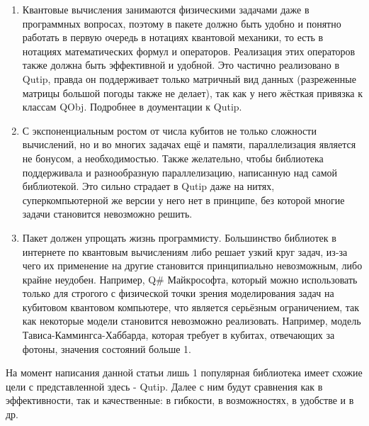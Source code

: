 \documentclass[aps,twocolumn,pra,showpacs,amsmath,amssymb,showkeys,10pt]{revtex4-2}
\begin{document}
          \begin{enumerate}
            \item Квантовые вычисления занимаются физическими задачами даже в программных вопросах, поэтому в пакете должно быть удобно и понятно работать в первую очередь в нотациях квантовой механики, 
            то есть в нотациях математических формул и операторов. Реализация этих операторов также должна быть эффективной и удобной. Это частично реализовано в Qutip, правда он поддерживает 
            только матричный вид данных (разреженные матрицы большой погоды также не делает), так как у него жёсткая привязка к классам QObj. Подробнее в доументации к Qutip.

            \item С экспоненциальным ростом от числа кубитов не только сложности вычислений, но и во многих задачах ещё и памяти, параллелизация является не бонусом, а необходимостью. Также желательно, 
            чтобы библиотека поддерживала и разнообразную параллелизацию, написанную над самой библиотекой.
            Это сильно страдает в Qutip даже на нитях, суперкомпьютерной же версии у него нет в принципе, без которой многие задачи становится невозможно решить.
            
            \item Пакет должен упрощать жизнь программисту. Большинство библиотек в интернете по квантовым вычислениям либо решает узкий круг задач, из-за чего их применение на другие становится 
            принципиально невозможным, либо крайне неудобен. Например, Q\# Майкрософта, который можно использовать только для строгого с физической точки зрения моделирования задач на
            кубитовом квантовом компьютере, что является серьёзным ограничением, так как некоторые модели становится невозможно реализовать. Например, модель Тависа-Каммингса-Хаббарда, которая требует 
            в кубитах, отвечающих за фотоны, значения состояний больше 1.
          \end{enumerate}

          На момент написания данной статьи лишь 1 популярная библиотека имеет схожие цели с представленной здесь - Qutip. Далее с ним будут сравнения как в эффективности, так и качественные: в гибкости, 
          в возможностях, в удобстве и в др.
\end{document}
